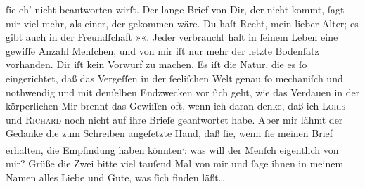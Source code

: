 \begin{ledgroupsized}[t]{13cm}
               ſie eh’ nicht beantworten wirſt. Der lange Brief\strikeout{,} von
               Dir, der nicht kommt, ſagt mir viel mehr, als 
               einer, der gekom{\pb}men wäre. Du haſt Recht, mein
               lieber Alter; es gibt auch in der Freundſchaft »\label{K_L02669-45v}\label{K_L02669-45h}«. Jeder verbraucht halt in ſeinem Leben eine gewiſſe Anzahl Menſchen, und von
               mir iſt nur mehr der letzte Bodenſatz vorhanden. Dir iſt kein Vorwurf zu machen. Es
               iſt die Natur, die es ſo eingerichtet, daß das Vergeſſen in der ſeeliſchen Welt genau
               ſo  mechaniſch und nothwendig und mit denſelben
               Endzwecken vor ſich geht, wie das Verdauen in der körperlichen{\dotsfour}\pend
           \pstart
           Mir brennt das Gewiſſen oft, wenn ich daran denke, daß ich \textsc{Loris} und \textsc{Richard} noch nicht auf ihre Brieſe geantwortet habe. Aber mir lähmt der Gedanke die zum
               Schreiben angeſetzte Hand, daß ſie, wenn ſie meinen Brief erhalten, die Empfindung
               haben könnten\substVorne{}\textsuperscript{\textcolor{gray}{,}}\substDazwischen{}:\substHinten{} was will der Menſch eigentlich von mir? Grüße die Zwei bitte viel {\pb}tauſend Mal von mir und ſage ihnen in meinem Namen
               alles Liebe und Gute, was ſich finden läßt{\dots}\pend

\end{ledgroupsized}
